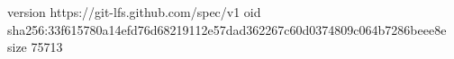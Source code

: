 version https://git-lfs.github.com/spec/v1
oid sha256:33f615780a14efd76d68219112e57dad362267c60d0374809c064b7286beee8e
size 75713
